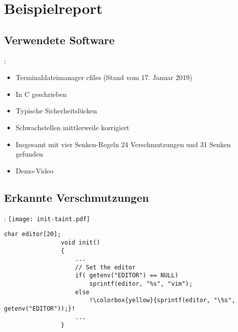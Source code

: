 \section{Beispielreport}

    \subsection{Verwendete Software}
        \begin{frame}{\secname: \subsecname}
            \begin{itemize}
                \item Terminaldateimanager cfiles (Stand vom 17. Januar 2019)
                \item In C geschrieben
                \item Typische Sicherheitslücken
                \item Schwachstellen mittlerweile korrigiert
                \item Insgesamt mit vier Senken-Regeln 24 Verschmutzungen und 31 Senken gefunden
                \item Demo-Video
            \end{itemize}
        \end{frame}

    \subsection{Erkannte Verschmutzungen}
        \begin{frame}[fragile]{\secname: \subsecname}
            \texttt{[image: init-taint.pdf]}
            \begin{lstlisting}[gobble=16, escapechar=!]
                char editor[20];
                void init()
                {
                    ...
                    // Set the editor
                    if( getenv("EDITOR") == NULL)
                        sprintf(editor, "%s", "vim");
                    else
                        !\colorbox{yellow}{sprintf(editor, "\%s", getenv("EDITOR"));}!
                    ...
                }
            \end{lstlisting}
        \end{frame}

